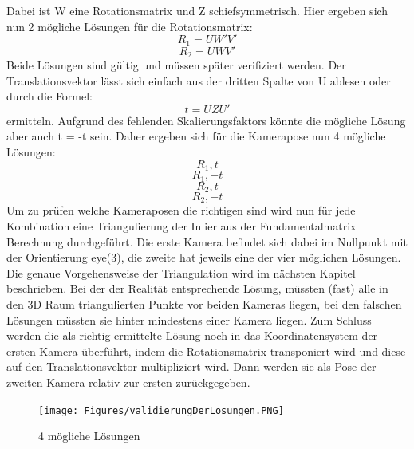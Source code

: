 Dabei ist W eine Rotationsmatrix und Z schiefsymmetrisch. Hier ergeben sich nun 2 mögliche Lösungen für die Rotationsmatrix:
$$R_1 = UW'V'$$
$$R_2 = UWV'$$
Beide Lösungen sind gültig und müssen später verifiziert werden. Der Translationsvektor lässt sich einfach aus der dritten Spalte von U ablesen oder durch die Formel:
$$t = UZU'$$
ermitteln. Aufgrund des fehlenden Skalierungsfaktors könnte die mögliche Lösung aber auch
t = -t
sein. Daher ergeben sich für die Kamerapose nun 4 mögliche Lösungen:
$$R_1, t$$
$$R_1, -t$$
$$R_2, t$$
$$R_2, -t$$
Um zu prüfen welche Kameraposen die richtigen sind wird nun für jede Kombination eine Triangulierung der Inlier aus der Fundamentalmatrix Berechnung durchgeführt. Die erste Kamera befindet sich dabei im Nullpunkt mit der Orientierung eye(3), die zweite hat jeweils eine der vier möglichen Lösungen. Die genaue Vorgehensweise der Triangulation wird im nächsten Kapitel beschrieben. Bei der der Realität entsprechende Lösung, müssten (fast) alle in den 3D Raum triangulierten Punkte vor beiden Kameras liegen, bei den falschen Lösungen müssten sie hinter mindestens einer Kamera liegen. Zum Schluss werden die als richtig ermittelte Lösung noch in das Koordinatensystem der ersten Kamera überführt, indem die Rotationsmatrix transponiert wird und diese auf den Translationsvektor multipliziert wird. Dann werden sie als Pose der zweiten Kamera relativ zur ersten zurückgegeben. \cite{Richard2000} \cite{LTH2013}
\begin{figure}[ht]
    \centering
    \texttt{[image: Figures/validierungDerLosungen.PNG]}
    \caption{4 mögliche Lösungen \cite{LTH2013}}
\end{figure}

